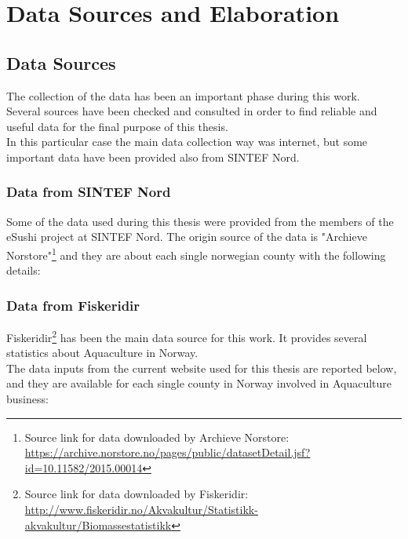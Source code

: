 
\newpage
\chapter{Data Sources and Elaboration}
\section{Data Sources}
The collection of the data has been an important phase during this work. \\
Several sources have been checked and consulted in order to find reliable and useful data for the final purpose of this thesis.\\
In this particular case the main data collection way was internet, but some important data have been provided also from SINTEF Nord.
\citation{}

\subsection{Data from SINTEF Nord}
Some of the data used during this thesis were provided from the members of the eSushi project at SINTEF Nord.
The origin source of the data is "Archieve Norstore"\footnote{Source link for data downloaded by Archieve Norstore: \\\url{https://archive.norstore.no/pages/public/datasetDetail.jsf?id=10.11582/2015.00014}} and they are about each single norwegian county with the following details:\\



\begin{table}[ht]
    \caption{Data provided from SINTEF Nord. }
    \label{table: SINTEF_Data} 
\end{table}



\newpage
 
\subsection{Data from Fiskeridir} 
Fiskeridir\footnote{Source link for data downloaded by Fiskeridir: \\ \url{http://www.fiskeridir.no/Akvakultur/Statistikk-akvakultur/Biomassestatistikk}} has been the main data source for this work. It provides several statistics about Aquaculture in Norway.\\
The data inputs from the current website used for this thesis are reported below, and they are available for each single county in Norway involved in Aquaculture business:

